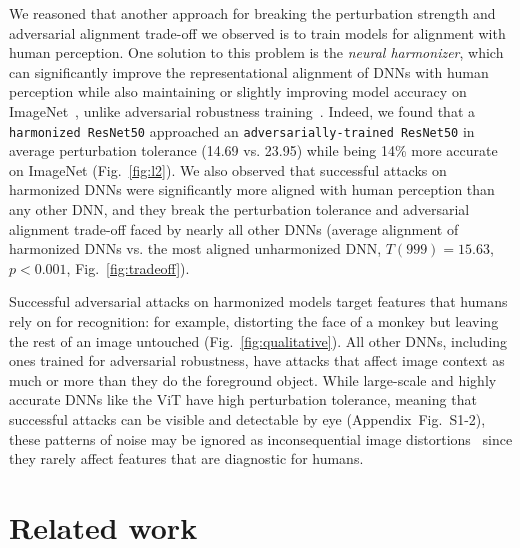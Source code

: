 \documentclass{article}
\theoremstyle{plain}
\theoremstyle{definition}
\theoremstyle{remark}
\begin{document}
We reasoned that another approach for breaking the perturbation strength and adversarial alignment trade-off we observed is to train models for alignment with human perception. One solution to this problem is the \emph{neural harmonizer}, which can significantly improve the representational alignment of DNNs with human perception while also maintaining or slightly improving model accuracy on ImageNet~\cite{Fel2022-dt}, unlike adversarial robustness training~\cite{PGD_madrytowards}. Indeed, we found that a \texttt{harmonized ResNet50} approached an \texttt{adversarially-trained ResNet50} in average perturbation tolerance (14.69 vs. 23.95) while being 14\% more accurate on ImageNet (Fig.~\ref{fig:l2}). We also observed that successful attacks on harmonized DNNs were significantly more aligned with human perception than any other DNN, and they break the perturbation tolerance and adversarial alignment trade-off faced by nearly all other DNNs (average alignment of harmonized DNNs vs. the most aligned unharmonized DNN, $T(999) = 15.63$, $p < 0.001$, Fig.~\ref{fig:tradeoff}). 

Successful adversarial attacks on harmonized models target features that humans rely on for recognition: for example, distorting the face of a monkey but leaving the rest of an image untouched (Fig.~\ref{fig:qualitative}). All other DNNs, including ones trained for adversarial robustness, have attacks that affect image context as much or more than they do the foreground object. While large-scale and highly accurate DNNs like the ViT have high perturbation tolerance, meaning that successful attacks can be visible and detectable by eye (Appendix~Fig.~S1-2), these patterns of noise may be ignored as inconsequential image distortions~\cite{Dujmovic2020-rv} since they rarely affect features that are diagnostic for humans. 

\section{Related work}
\end{document}
